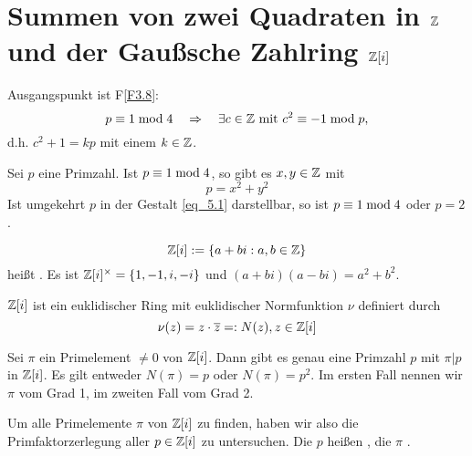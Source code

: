 \section{Summen von zwei Quadraten in $\mathbb{Z}$ und der Gaußsche Zahlring $\mathbb{Z}[i]$}
\label{sec:para5}
	Ausgangspunkt ist F\ref{F3.8}:	
	\[ p \equiv 1 \bmod 4 \quad \Rightarrow \quad \exists c \in \mathbb{Z} \text{ mit } c^2 \equiv -1 \bmod p, \]
	d.h. $c^2 + 1 = kp$ mit einem $k \in \mathbb{Z}$.
	
\begin{satz} \label{satz_5.1}
	Sei $p$ eine Primzahl. Ist $p \equiv 1 \bmod 4$, so gibt es $x,y \in \mathbb{Z}$ mit
	\begin{equation}
		p = x^2 + y^2 \label{eq_5.1}
	\end{equation}
	Ist umgekehrt $p$ in der Gestalt \eqref{eq_5.1} darstellbar, so ist $p \equiv 1 \bmod 4$ oder $p = 2$.
\end{satz}

\begin{defn}
	\[ \mathbb{Z}[i] := \{a + bi : a,b \in \mathbb{Z}\} \]	
	heißt . Es ist $\mathbb{Z}[i]^\times = \{1, -1, i, -i\}$ und $(a+bi)(a-bi) = a^2+b^2$.
\end{defn}

\begin{satz} \label{satz_5.2}
	$\mathbb{Z}[i]$ ist ein euklidischer Ring mit euklidischer Normfunktion $\nu$ definiert durch 
	\[ \nu(z) = z \cdot \overline{z} =: N(z), z \in \mathbb{Z}[i] \]
\end{satz}

\begin{falko} \label{F5.1}
	Sei $\pi$ ein Primelement $\neq 0$ von $\mathbb{Z}[i]$. Dann gibt es genau eine Primzahl $p$ mit $\pi | p$ in $\mathbb{Z}[i]$. Es gilt entweder $N(\pi)=p$ oder $N(\pi)=p^2$. Im ersten Fall nennen wir $\pi$ vom Grad 1, im zweiten Fall vom Grad 2.
\end{falko}

Um alle Primelemente $\pi$ von $\mathbb{Z}[i]$ zu finden, haben wir also die Primfaktorzerlegung aller $p \in \mathbb{Z}[i]$ zu untersuchen. Die $p$ heißen , die $\pi$ .  

